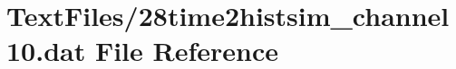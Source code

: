 \hypertarget{28time2histsim__channel10_8dat}{}\section{Text\+Files/28time2histsim\+\_\+channel10.dat File Reference}
\label{28time2histsim__channel10_8dat}
